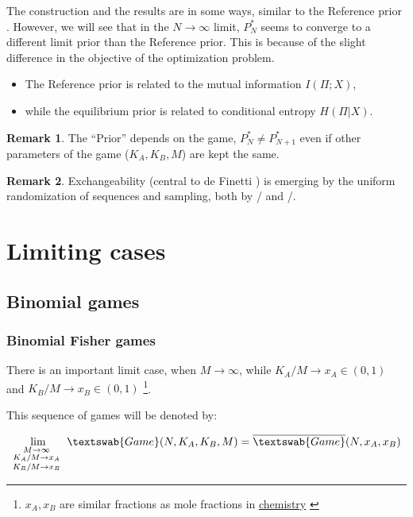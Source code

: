 \documentclass{article}
\theoremstyle{definition}
\newtheorem*{remark}{Remark}
\begin{document}
The construction and the results are in some ways, similar to the Reference prior \cite{paper:ReferencePrior,book:Bernardo}. However, we will see that in the $N\to\infty$ limit, $P^*_N$ seems to converge to a different limit prior than the Reference prior.
    This is because of the slight difference in the objective of the optimization problem.
    \begin{itemize}
        \item The Reference prior is related to the mutual information $I(\Pi;X)$,
        \item while the equilibrium prior is related to conditional entropy $H(\Pi|X)$. 
    \end{itemize}

\begin{remark}
    The ``Prior'' depends on the game, $P^*_N \ne P^*_{N+1}$ even if other parameters of the game ($K_A,K_B,M$) are kept the same.
    
\end{remark}

\begin{remark}
    Exchangeability (central to de Finetti \cite{book:deFinetti}) is emerging by the uniform randomization of sequences and sampling, both by \PI/ and \PII/.
    
\end{remark}


\section{Limiting cases}

\subsection{Binomial games}

\subsubsection{Binomial Fisher games}

There is an important limit case, when $M \to \infty$, while $K_A/M \to x_A \in (0,1)$ and $K_B/M \to x_B \in (0,1)$ \footnote{$x_A, x_B$ are similar fractions as mole fractions in \href{https://goldbook.iupac.org/terms/view/A00296}{chemistry} \cite{book:ChemistryGoldBook}}.

This sequence of games will be denoted by:

\begin{equation}
    \lim_{\begin{smallmatrix} M \to \infty & \\ K_A/M \to x_A \\ K_B/M \to x_B \end{smallmatrix}} \textswab{Game}(N, K_A, K_B, M) = \overline{\textswab{Game}}(N, x_A, x_B)
\end{equation}
\end{document}
